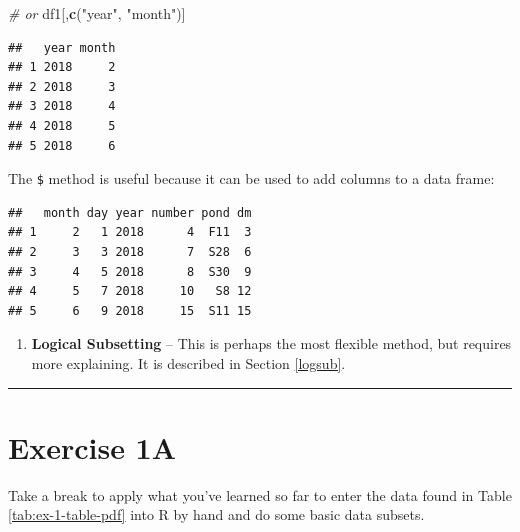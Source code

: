 \documentclass[]{book}
\newenvironment{Shaded}{\begin{snugshade}}{\end{snugshade}}
\newcommand{\KeywordTok}[1]{\textcolor[rgb]{0.13,0.29,0.53}{\textbf{#1}}}
\newcommand{\StringTok}[1]{\textcolor[rgb]{0.31,0.60,0.02}{#1}}
\newcommand{\CommentTok}[1]{\textcolor[rgb]{0.56,0.35,0.01}{\textit{#1}}}
\newcommand{\OperatorTok}[1]{\textcolor[rgb]{0.81,0.36,0.00}{\textbf{#1}}}
\newcommand{\NormalTok}[1]{#1}
\providecommand{\tightlist}{%
  \setlength{\itemsep}{0pt}\setlength{\parskip}{0pt}}
\theoremstyle{definition}
\theoremstyle{definition}
\theoremstyle{definition}
\theoremstyle{remark}
\begin{document}
\begin{Shaded}
\begin{Highlighting}[]
\CommentTok{# or}
\NormalTok{df1[,}\KeywordTok{c}\NormalTok{(}\StringTok{"year"}\NormalTok{, }\StringTok{"month"}\NormalTok{)]}
\end{Highlighting}
\end{Shaded}

\begin{verbatim}
##   year month
## 1 2018     2
## 2 2018     3
## 3 2018     4
## 4 2018     5
## 5 2018     6
\end{verbatim}

The \texttt{\$} method is useful because it can be used to add columns
to a data frame:

\begin{Shaded}
\end{Shaded}

\begin{verbatim}
##   month day year number pond dm
## 1     2   1 2018      4  F11  3
## 2     3   3 2018      7  S28  6
## 3     4   5 2018      8  S30  9
## 4     5   7 2018     10   S8 12
## 5     6   9 2018     15  S11 15
\end{verbatim}

\begin{enumerate}
\def\labelenumi{\arabic{enumi}.}
\setcounter{enumi}{2}
\tightlist
\item
  \textbf{Logical Subsetting} -- This is perhaps the most flexible
  method, but requires more explaining. It is described in Section
  \ref{logsub}.
\end{enumerate}

\begin{center}\rule{0.5\linewidth}{\linethickness}\end{center}

\section*{Exercise 1A}\label{exercise-1a}

Take a break to apply what you've learned so far to enter the data found
in Table \ref{tab:ex-1-table-pdf} into R by hand and do some basic data
subsets.
\end{document}
